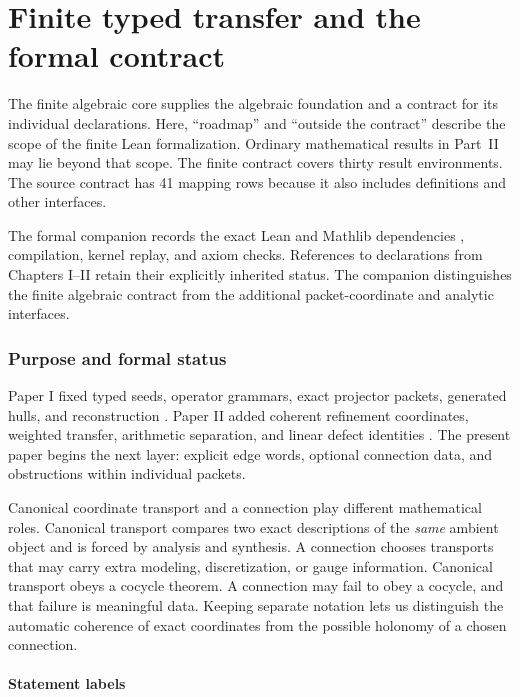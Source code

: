 \part{Finite typed transfer and the formal contract}\label{part:finite}
\noindent The finite algebraic core supplies the algebraic foundation and a contract for its individual declarations. Here, ``roadmap'' and ``outside the contract'' describe the scope of the finite Lean formalization. Ordinary mathematical results in Part~II may lie beyond that scope. The finite contract covers thirty result environments. The source contract has 41 mapping rows because it also includes definitions and other interfaces.

\medskip\noindent The formal companion records the exact Lean and Mathlib dependencies \cite{lean,mathlib}, compilation, kernel replay, and axiom checks. References to declarations from Chapters I--II retain their explicitly inherited status. The companion distinguishes the finite algebraic contract from the additional packet-coordinate and analytic interfaces.
\section{Purpose and formal status}
\label{sec:purpose}

Paper I fixed typed seeds, operator grammars, exact projector packets,
generated hulls, and reconstruction \cite{paperI}.  Paper II added coherent
refinement coordinates, weighted transfer, arithmetic separation, and linear
defect identities \cite{paperII}.  The present paper begins the next layer:
explicit edge words, optional connection data, and obstructions within
individual packets.

Canonical coordinate transport and a connection play different mathematical
roles. Canonical transport compares two exact descriptions of the
\emph{same} ambient object and is forced by analysis and synthesis. A
connection chooses transports that may carry extra modeling, discretization,
or gauge information. Canonical transport obeys a cocycle theorem. A
connection may fail to obey a cocycle, and that failure is meaningful data.
Keeping separate notation lets us distinguish the automatic coherence of
exact coordinates from the possible holonomy of a chosen connection.

\subsection{Statement labels}


